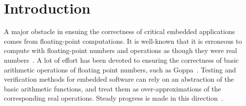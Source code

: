 \section{Introduction}

A major obstacle in ensuing the correctness of critical embedded applications comes from floating-point computations. It is well-known that it is erroneous to compute with floating-point numbers and operations as though they were real numbers~\cite{pitfalls}. A lot of effort has been devoted to ensuring the correctness of basic arithmetic operations of floating point numbers, such as Goppa~\cite{}. Testing and verification methods for embedded software can rely on an abstraction of the basic arithmetic functions, and treat them as over-approximations of the corresponding real operations. Steady progress is made in this direction~\cite{}. 

